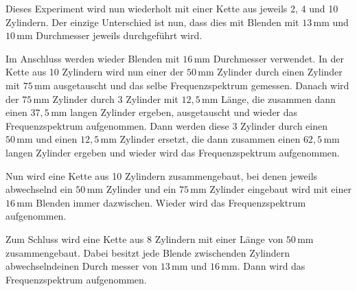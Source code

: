 Dieses Experiment wird nun wiederholt mit einer Kette aus jeweils 2, 4 und 10 Zylindern. Der einzige Unterschied ist nun, dass dies mit Blenden mit $13 \, \mathrm{mm}$ und $10 \, \mathrm{mm}$ Durchmesser jeweils durchgeführt wird. \newline

Im Anschluss werden wieder Blenden mit $16 \, \mathrm{mm}$ Durchmesser verwendet. In der Kette aus 10 Zylindern wird nun einer der $50 \, \mathrm{mm}$ Zylinder durch einen Zylinder mit $75 \, \mathrm{mm}$ ausgetauscht und das selbe Frequenzspektrum gemessen. Danach wird der $75 \, \mathrm{mm}$ Zylinder durch 3 Zylinder mit $12, \! 5 \, \mathrm{mm}$ Länge, die zusammen dann einen $37, \! 5 \, \mathrm{mm}$ langen Zylinder ergeben, ausgetauscht und wieder das Frequenzspektrum aufgenommen. Dann werden diese 3 Zylinder durch einen $50 \, \mathrm{mm}$ und einen $12, \! 5 \, \mathrm{mm}$ Zylinder ersetzt, die dann zusammen einen $62, \! 5 \, \mathrm{mm}$ langen Zylinder ergeben und wieder wird das Frequenzspektrum aufgenommen. \newline

Nun wird eine Kette aus 10 Zylindern zusammengebaut, bei denen jeweils abwechselnd ein $50 \, \mathrm{mm}$ Zylinder und ein $75 \, \mathrm{mm}$ Zylinder eingebaut wird mit einer $16 \, \mathrm{mm}$ Blenden immer dazwischen. Wieder wird das Frequenzspektrum aufgenommen. \newline

Zum Schluss wird eine Kette aus 8 Zylindern mit einer Länge von $50 \, \mathrm{mm}$ zusammengebaut. Dabei besitzt jede Blende zwischenden Zylindern abwechselndeinen Durch messer von $13 \, \mathrm{mm}$ und $16 \, \mathrm{mm}$. Dann wird das Frequenzspektrum aufgenommen.
